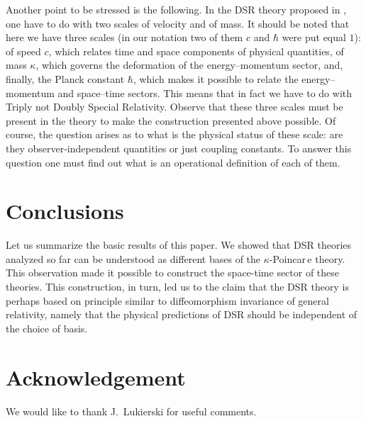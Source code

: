\documentclass[a4paper,a4paper]{article}
\begin{document}
Another point to be stressed is the following. In the DSR theory
proposed in \cite{gac1}, \cite{gac2} one have to do with two
scales of velocity and of mass. It should be noted that here we
have three scales (in our notation two of them $c$ and $\hbar$
were put equal  $1$): of speed $c$, which relates time and space
components of physical quantities, of mass $\kappa$, which governs
the deformation of the energy--momentum sector, and, finally, the
Planck constant $\hbar$, which makes it possible to relate the
energy--momentum and space--time sectors. This means that in fact
we have to do with Triply not Doubly Special Relativity. Observe
that these three scales must be present in the theory to make the
construction presented above possible. Of course, the question
arises as to what is the physical status of these scale: are they
observer-independent quantities or just coupling constants. To
answer this question one must find out what is an operational
definition of each of them.




\section{Conclusions }

Let us summarize the basic results of this paper. We showed that
DSR theories analyzed so far can be understood as different bases
of the $\kappa$-Poincar\,e theory. This observation made it
possible to construct the space-time sector of these theories.
This construction, in turn, led us to the claim that the DSR
theory is perhaps based on principle similar to diffeomorphism
invariance of general relativity, namely that the physical
predictions of DSR should be independent of the choice of basis.

\section*{Acknowledgement}

We would like to thank J.~Lukierski for useful comments.
\end{document}
